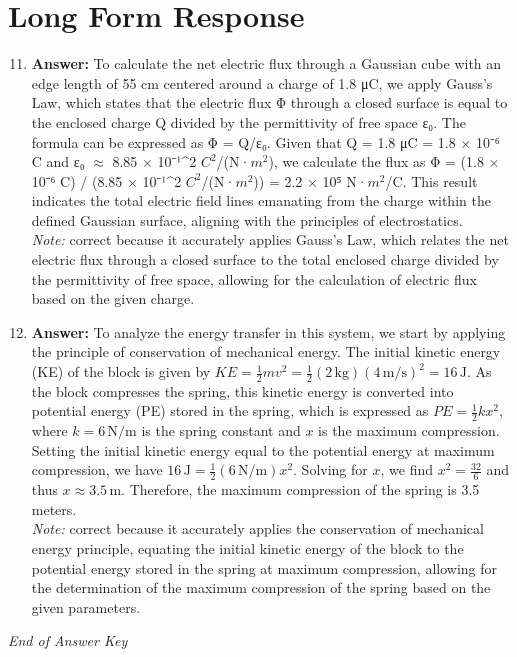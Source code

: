 \documentclass[12pt]{article}
\begin{document}
\section*{Long Form Response}
\begin{enumerate}[label=\arabic*.]
\setcounter{enumi}{10}
\item \textbf{Answer:} To calculate the net electric flux through a Gaussian cube with an edge length of 55 cm centered around a charge of 1.8 μC, we apply Gauss's Law, which states that the electric flux Φ through a closed surface is equal to the enclosed charge Q divided by the permittivity of free space ε₀. The formula can be expressed as Φ = Q/ε₀. Given that Q = 1.8 μC = 1.8 \ensuremath{\times} 10⁻⁶ C and ε₀ \ensuremath{\approx} 8.85 \ensuremath{\times} 10⁻¹^2 $C^2$/(N·$m^2$), we calculate the flux as Φ = (1.8 \ensuremath{\times} 10⁻⁶ C) / (8.85 \ensuremath{\times} 10⁻¹^2 $C^2$/(N·$m^2$)) = 2.2 \ensuremath{\times} 10⁵ N·$m^2$/C. This result indicates the total electric field lines emanating from the charge within the defined Gaussian surface, aligning with the principles of electrostatics.
\\ \textit{Note:} correct because it accurately applies Gauss's Law, which relates the net electric flux through a closed surface to the total enclosed charge divided by the permittivity of free space, allowing for the calculation of electric flux based on the given charge.
\item \textbf{Answer:} To analyze the energy transfer in this system, we start by applying the principle of conservation of mechanical energy. The initial kinetic energy (KE) of the block is given by \( KE = \frac{1}{2}mv^2 = \frac{1}{2}(2\, \text{kg})(4\, \text{m/s})^2 = 16\, \text{J} \). As the block compresses the spring, this kinetic energy is converted into potential energy (PE) stored in the spring, which is expressed as \( PE = \frac{1}{2}kx^2 \), where \( k = 6\, \text{N/m} \) is the spring constant and \( x \) is the maximum compression. Setting the initial kinetic energy equal to the potential energy at maximum compression, we have \( 16\, \text{J} = \frac{1}{2}(6\, \text{N/m})x^2 \). Solving for \( x \), we find \( x^2 = \frac{32}{6} \) and thus \( x \approx 3.5\, \text{m} \). Therefore, the maximum compression of the spring is 3.5 meters.
\\ \textit{Note:} correct because it accurately applies the conservation of mechanical energy principle, equating the initial kinetic energy of the block to the potential energy stored in the spring at maximum compression, allowing for the determination of the maximum compression of the spring based on the given parameters.
\end{enumerate}

\vfill
\noindent\textit{End of Answer Key}
\end{document}
